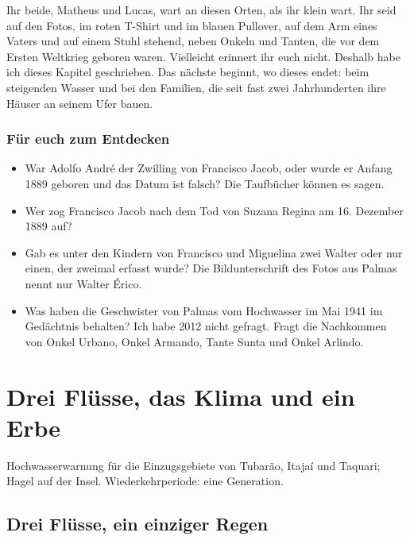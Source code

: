 \documentclass[
  ngerman,
  11pt,
  openany]{book}
\providecommand{\tightlist}{%
  \setlength{\itemsep}{0pt}\setlength{\parskip}{0pt}}
\newenvironment{boletim}{\begin{center}\begin{minipage}{0.85\linewidth}\small\itshape}{\end{minipage}\end{center}}
\begin{document}
Ihr beide, Matheus und Lucas, wart an diesen Orten, als ihr klein wart.
Ihr seid auf den Fotos, im roten T-Shirt und im blauen Pullover, auf dem
Arm eines Vaters und auf einem Stuhl stehend, neben Onkeln und Tanten,
die vor dem Ersten Weltkrieg geboren waren. Vielleicht erinnert ihr euch
nicht. Deshalb habe ich dieses Kapitel geschrieben. Das nächste beginnt,
wo dieses endet: beim steigenden Wasser und bei den Familien, die seit
fast zwei Jahrhunderten ihre Häuser an seinem Ufer bauen.

\section{Für euch zum Entdecken}\label{fuxfcr-euch-zum-entdecken-11}

\begin{itemize}
\tightlist
\item
  War Adolfo André der Zwilling von Francisco Jacob, oder wurde er
  Anfang 1889 geboren und das Datum ist falsch? Die Taufbücher können es
  sagen.
\item
  Wer zog Francisco Jacob nach dem Tod von Suzana Regina am 16. Dezember
  1889 auf?
\item
  Gab es unter den Kindern von Francisco und Miguelina zwei Walter oder
  nur einen, der zweimal erfasst wurde? Die Bildunterschrift des Fotos
  aus Palmas nennt nur Walter Érico.
\item
  Was haben die Geschwister von Palmas vom Hochwasser im Mai 1941 im
  Gedächtnis behalten? Ich habe 2012 nicht gefragt. Fragt die Nachkommen
  von Onkel Urbano, Onkel Armando, Tante Sunta und Onkel Arlindo.
\end{itemize}

\part{Drei Flüsse, das Klima und ein
Erbe}\label{drei-fluxfcsse-das-klima-und-ein-erbe}

\begin{boletim}

Hochwasserwarnung für die Einzugsgebiete von Tubarão, Itajaí und
Taquari; Hagel auf der Insel. Wiederkehrperiode: eine Generation.

\end{boletim}

\chapter{Drei Flüsse, ein einziger Regen}\label{cap-13}
\end{document}
